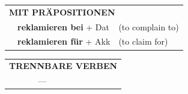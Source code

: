 \documentclass[10pt,a4paper]{revtex4-2}
\begin{document}
\begin{verbbox}
\vspace{10pt}

\begin{tabular}{lll}
\multicolumn{3}{l}{\textbf{MIT PRÄPOSITIONEN}}\\
& \textbf{reklamieren bei} + Dat & (to complain to)\\
& \textbf{reklamieren für} + Akk & (to claim for)\\
\end{tabular}
\hfill
\begin{tabular}{lll}
\multicolumn{3}{l}{\textbf{TRENNBARE VERBEN}}\\
& ---\\
\end{tabular}
\vspace{-5pt}
\end{verbbox}
\end{document}
